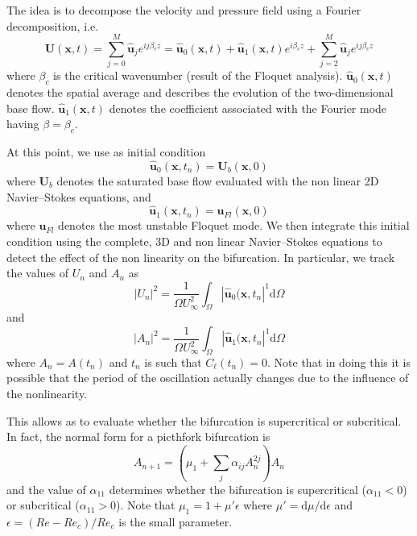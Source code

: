 \documentclass{jfm}
\begin{document}
The idea is to decompose the velocity and pressure field using a Fourier decomposition, i.e.
%
\begin{equation}
  \bm{U}(\bm{x},t) = \sum_{j=0}^M \hat{\bm{u}}_j e^{i j \beta_c z} = \hat{\bm{u}}_0(\bm{x},t) + \hat{\bm{u}}_1(\bm{x},t) e^{i \beta_c z}+
                     \sum_{j=2}^M \hat{\bm{u}}_j e^{i j \beta_c z} 
\end{equation}
%
where $\beta_c$ is the critical wavenumber (result of the Floquet analysis). $\hat{\bm{u}}_0(\bm{x},t)$ denotes the spatial average and describes the evolution of the two-dimensional base flow. $\hat{\bm{u}}_1(\bm{x},t)$ denotes the coefficient associated with the Fourier mode having $\beta = \beta_c$.

At this point, we use as initial condition 
%
\begin{equation}
  \hat{\bm{u}}_0(\bm{x},t_n) = \bm{U}_b(\bm{x},0)
\end{equation}
%
where $\bm{U}_b$ denotes the saturated base flow evaluated with the non linear 2D Navier--Stokes equations, and
%
\begin{equation}
  \hat{\bm{u}}_1(\bm{x},t_n) = \bm{u}_{Fl}(\bm{x},0)
\end{equation}
%
where $\bm{u}_{Fl}$ denotes the most unstable Floquet mode.
We then integrate this initial condition using the complete, 3D and non linear Navier--Stokes equations to detect the effect of the non linearity on the bifurcation. In particular, we track the values of $U_n$ and $A_n$ as
%
\begin{equation}
  |U_n|^2 = \frac{1}{\Omega U_\infty^2} \int_{\Omega} | \hat{\bm{u}}_0(\bm{x},t_n |^1 \text{d}\Omega
\end{equation}
%
and
\begin{equation}
  |A_n|^2 = \frac{1}{\Omega U_\infty^2} \int_{\Omega} | \hat{\bm{u}}_1(\bm{x},t_n |^1 \text{d}\Omega
\end{equation}
%
where $A_n=A(t_n)$ and $t_n$ is such that $C_\ell(t_n) = 0$. Note that in doing this it is possible that the period of the oscillation actually changes due to the influence of the nonlinearity.

This allows as to evaluate whether the bifurcation is supercritical or subcritical. In fact, the normal form for a picthfork bifurcation is
%
\begin{equation}
  A_{n+1} = \left( \mu_1 + \sum_j \alpha_{ij}A_n^{2j} \right) A_n
\end{equation}
%
and the value of $\alpha_{11}$ determines whether the bifurcation is supercritical ($\alpha_{11}<0$) or subcritical ($\alpha_{11}>0$). Note that $\mu_1 = 1 + \mu'\epsilon$ where $\mu' = \text{d}\mu/\text{d}\epsilon$ and $\epsilon = (Re - Re_c)/Re_c$ is the small parameter.
\end{document}

